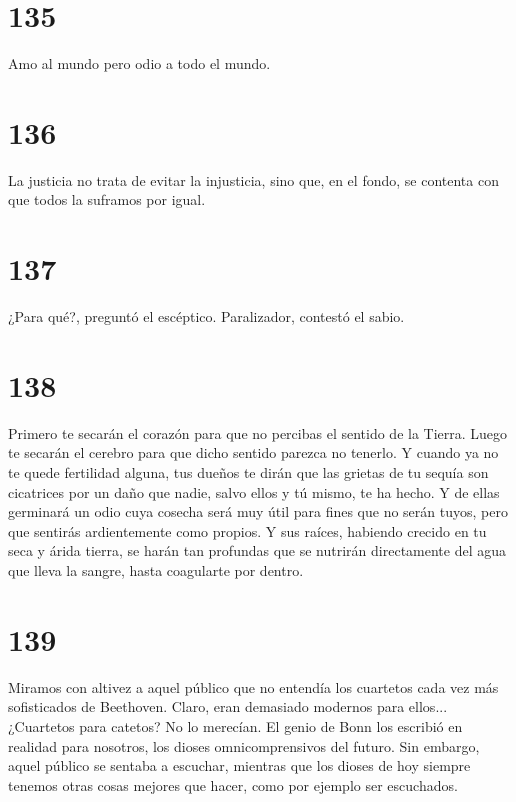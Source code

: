 \documentclass[a4paper,11pt,openright,twocolumn]{book}
\begin{document}
\section*{135}

Amo al mundo pero odio a todo el mundo. 

\section*{136}

La justicia no trata de evitar la injusticia, sino que, en el fondo, se contenta con que todos la suframos
por igual. 

\section*{137}

¿Para qué?, preguntó el escéptico. Paralizador, contestó el sabio.

\section*{138}

Primero te secarán el corazón para que no percibas el sentido de la Tierra. Luego te secarán el
cerebro para que dicho sentido parezca no tenerlo. Y cuando ya no te quede fertilidad alguna, 
tus dueños te dirán que las grietas de tu sequía son cicatrices por un daño que nadie, salvo ellos
y tú mismo, te ha hecho. Y de ellas germinará un odio cuya cosecha será muy útil para fines que no serán
tuyos, pero que sentirás ardientemente como propios. Y sus raíces, habiendo crecido en tu seca y árida
tierra, se harán tan profundas que se nutrirán directamente del agua que lleva la sangre, hasta coagularte
por dentro. 

\section*{139}

Miramos con altivez a aquel público que no entendía los cuartetos cada vez más sofisticados de Beethoven.
Claro, eran demasiado modernos para ellos... ¿Cuartetos para catetos? No lo merecían. El genio de Bonn
los escribió en realidad para nosotros, los dioses omnicomprensivos
del futuro. Sin embargo, aquel público se sentaba a escuchar, mientras que los dioses de hoy siempre
tenemos otras cosas mejores que hacer, como por ejemplo ser escuchados. 
\end{document}
